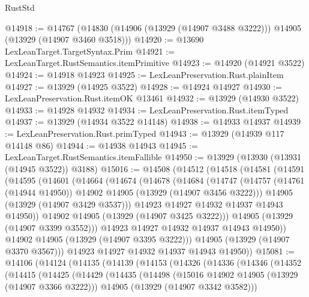 \begin{lexlean}{RustStd}
\begin{coremodule}
{\begin{coremodule}
{{{{{{{{{{{{{{{{{{{{{{{{{{{{{{{{{{{{{@14918 := @14767
    (@14830 (@14906 (@13929 (@14907 @3488 @3222))) @14905 (@13929 (@14907 @3460 @3518)))
@14920 := @13690 LexLeanTarget.TargetSyntax.Prim
@14921 := LexLeanTarget.RustSemantics.itemPrimitive
@14923 := @14920 (@14921 @3522)
@14924 := @14918 @14923
@14925 := LexLeanPreservation.Rust.plainItem
@14927 := @13929 (@14925 @3522)
@14928 := @14924 @14927
@14930 := LexLeanPreservation.Rust.itemOK @13461
@14932 := @13929 (@14930 @3522)
@14933 := @14928 @14932
@14934 := LexLeanPreservation.Rust.itemTyped
@14937 := @13929 (@14934 @3522 @14148)
@14938 := @14933 @14937
@14939 := LexLeanPreservation.Rust.primTyped
@14943 := @13929 (@14939 @117 @14148 @86)
@14944 := @14938 @14943
@14945 := LexLeanTarget.RustSemantics.itemFallible
@14950 := @13929 (@13930 (@13931 (@14945 @3522)) @3188)
@15016 := @14508
    (@14512
      (@14518
        (@14581
          (@14591
            (@14595
              (@14601
                (@14664
                  (@14674
                    (@14678
                      (@14684
                        (@14747
                          (@14757
                            (@14761 (@14944 @14950))
                            @14902
                            @14905
                            (@13929 (@14907 @3456 @3222)))
                          @14905
                          (@13929 (@14907 @3429 @3537)))
                        @14923
                        @14927
                        @14932
                        @14937
                        @14943
                        @14950))
                    @14902
                    @14905
                    (@13929 (@14907 @3425 @3222)))
                  @14905
                  (@13929 (@14907 @3399 @3552)))
                @14923
                @14927
                @14932
                @14937
                @14943
                @14950))
            @14902
            @14905
            (@13929 (@14907 @3395 @3222)))
          @14905
          (@13929 (@14907 @3370 @3567)))
        @14923
        @14927
        @14932
        @14937
        @14943
        @14950))
@15081 := @14106
    (@14124
      (@14135
        (@14139
          (@14153
            (@14326
              (@14336
                (@14346
                  (@14352
                    (@14415
                      (@14425
                        (@14429
                          (@14435
                            (@14498
                              (@15016 @14902 @14905 (@13929 (@14907 @3366 @3222)))
                              @14905
                              (@13929 (@14907 @3342 @3582)))
}}}}}}}}}}}}}}}}}}}}}}}}}}}}}}}}}}}}}
\end{coremodule}}
\end{coremodule}
\end{lexlean}
